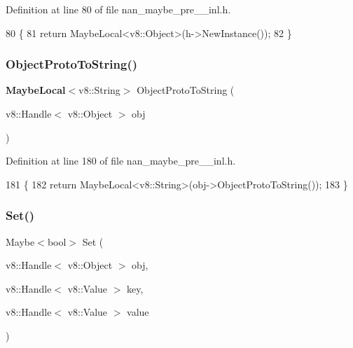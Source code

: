 Definition at line 80 of file nan\+\_\+maybe\+\_\+pre\+\_\+\_\+inl.\+h.


\begin{DoxyCode}
80                                                                \{
81   \textcolor{keywordflow}{return} MaybeLocal<v8::Object>(h->NewInstance());
82 \}
\end{DoxyCode}
\mbox{\label{nan__maybe__pre__43__inl_8h_a004ee56644144ee7b762267e3408fa5f}} 
\subsubsection{Object\+Proto\+To\+String()}
{\footnotesize\ttfamily \textbf{ Maybe\+Local}$<$v8\+::\+String$>$ Object\+Proto\+To\+String (\begin{DoxyParamCaption}\item[{v8\+::\+Handle$<$ v8\+::\+Object $>$}]{obj }\end{DoxyParamCaption})}



Definition at line 180 of file nan\+\_\+maybe\+\_\+pre\+\_\+\_\+inl.\+h.


\begin{DoxyCode}
181                             \{
182   \textcolor{keywordflow}{return} MaybeLocal<v8::String>(obj->ObjectProtoToString());
183 \}
\end{DoxyCode}
\mbox{\label{nan__maybe__pre__43__inl_8h_acefeb30f03bf5fb54df2b1b06ab49918}} 
\subsubsection{Set()\hspace{0.1cm}{\footnotesize\ttfamily [1/2]}}
{\footnotesize\ttfamily Maybe$<$bool$>$ Set (\begin{DoxyParamCaption}\item[{v8\+::\+Handle$<$ v8\+::\+Object $>$}]{obj,  }\item[{v8\+::\+Handle$<$ v8\+::\+Value $>$}]{key,  }\item[{v8\+::\+Handle$<$ v8\+::\+Value $>$}]{value }\end{DoxyParamCaption})}



